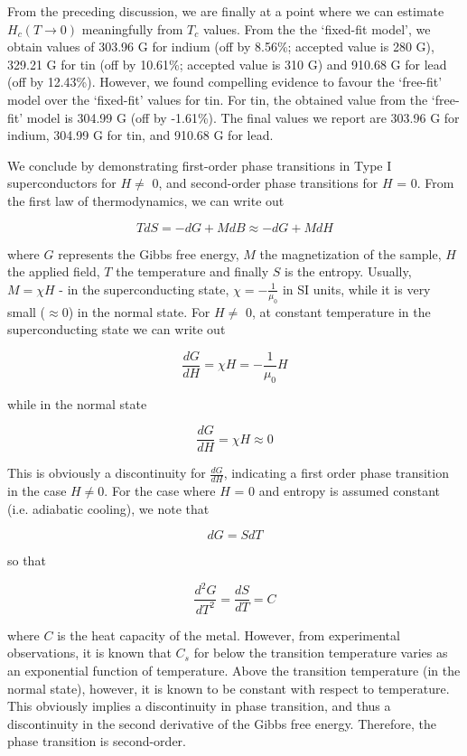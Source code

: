 \documentclass[aps,prl,nofootinbib,twocolumn,superscriptaddress,groupedaddress]{revtex4}  %
\begin{document}
From the preceding discussion, we are finally at a point where we can estimate $H_{c}(T \rightarrow 0)$ meaningfully from $T_{c}$ values. From the the `fixed-fit model', we obtain values of 303.96 G for indium (off by 8.56\%; accepted value is 280 G), 329.21 G for tin (off by 10.61\%; accepted value is 310 G) and 910.68 G for lead (off by 12.43\%). However, we found compelling evidence to favour the `free-fit' model over the `fixed-fit' values for tin. For tin, the obtained value from the `free-fit' model is 304.99 G (off by -1.61\%). The final values we report are 303.96 G for indium, 304.99 G for tin, and 910.68 G for lead.

We conclude by demonstrating first-order phase transitions in Type I superconductors for $H \neq$ 0, and second-order phase transitions for $H$ = 0. From the first law of thermodynamics, we can write out

$$ TdS =  - dG + M dB  \approx - dG + M dH$$

where $G$ represents the Gibbs free energy, $M$ the magnetization of the sample, $H$ the applied field, $T$ the temperature and finally $S$ is the entropy. Usually, $M = \chi H$ - in the superconducting state, $\chi = - \frac{1}{\mu_{0}}$ in SI units, while it is very small ($\approx 0$) in the normal state. For $H \neq$ 0, at constant temperature in the superconducting state we can write out

$$ \frac{dG}{dH} =  \chi H = - \frac{1}{\mu_{0}}H $$

while in the normal state

$$ \frac{dG}{dH} =  \chi H  \approx 0$$

This is obviously a discontinuity for $\frac{dG}{dH}$,  indicating a first order phase transition in the case $H \neq 0$. For the case where $H$ = 0 and entropy is assumed constant (i.e. adiabatic cooling), we note that 

$$ dG = S dT $$

so that

$$ \frac{d^{2}G}{dT^{2}} = \frac{dS}{dT} = C$$

where $C$ is the heat capacity of the metal. However, from experimental observations, it is known that $C_{s}$ for below the transition temperature varies as an exponential function of temperature\cite{kittel}. Above the transition temperature (in the normal state), however, it is known to be constant with respect to temperature. This obviously implies a discontinuity in phase transition, and thus a discontinuity in the second derivative of the Gibbs free energy. Therefore, the phase transition is second-order.
\end{document}
